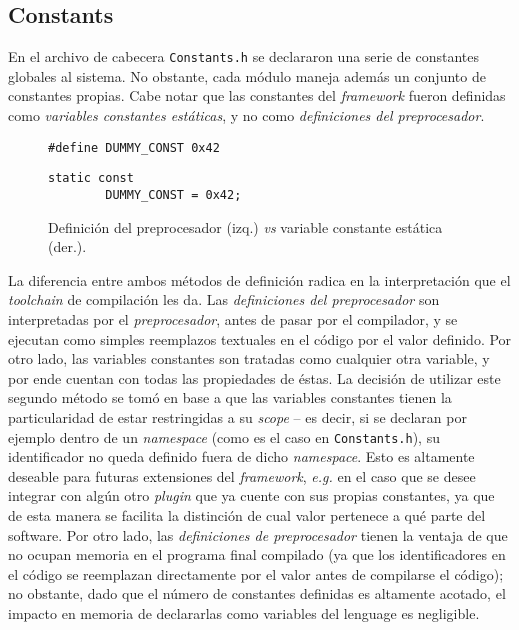 \subsection{Constants}

En el archivo de cabecera \texttt{Constants.h} se declararon una serie de constantes globales al sistema. No obstante, cada módulo maneja además un conjunto de constantes propias. Cabe notar que las constantes del \emph{framework} fueron definidas como \emph{variables constantes estáticas}, y no como \emph{definiciones del preprocesador}.

\begin{figure}[h]
    \centering
    \begin{minipage}{.49\linewidth}
        \begin{lstlisting}[style=CPP, numbers=none, frame=none, backgroundcolor=\color{white}]
        #define DUMMY_CONST 0x42
        \end{lstlisting}
    \end{minipage}
    \begin{minipage}{.49\linewidth}
        \begin{lstlisting}[style=CPP, numbers=none, frame=l, backgroundcolor=\color{white}]
        static const
        DUMMY_CONST = 0x42;
        \end{lstlisting}
    \end{minipage}
    \caption{Definición del preprocesador (izq.) \emph{vs} variable constante estática (der.).}
\end{figure}

La diferencia entre ambos métodos de definición radica en la interpretación que el \emph{toolchain} de compilación les da. Las \emph{definiciones del preprocesador} son interpretadas por el \emph{preprocesador}, antes de pasar por el compilador, y se ejecutan como simples reemplazos textuales en el código por el valor definido. Por otro lado, las variables constantes son tratadas como cualquier otra variable, y por ende cuentan con todas las propiedades de éstas. La decisión de utilizar este segundo método se tomó en base a que las variables constantes tienen la particularidad de estar restringidas a su \emph{scope} -- es decir, si se declaran por ejemplo dentro de un \emph{namespace} (como es el caso en \texttt{Constants.h}), su identificador no queda definido fuera de dicho \emph{namespace}.
Esto es altamente deseable para futuras extensiones del \emph{framework}, \emph{e.g.} en el caso que se desee integrar con algún otro \emph{plugin} que ya cuente con sus propias constantes, ya que de esta manera se facilita la distinción de cual valor pertenece a qué parte del software. Por otro lado, las \emph{definiciones de preprocesador} tienen la ventaja de que no ocupan memoria en el programa final compilado (ya que los identificadores en el código se reemplazan directamente por el valor antes de compilarse el código); no obstante, dado que el número de constantes definidas es altamente acotado, el impacto en memoria de declararlas como variables del lenguage es negligible.

